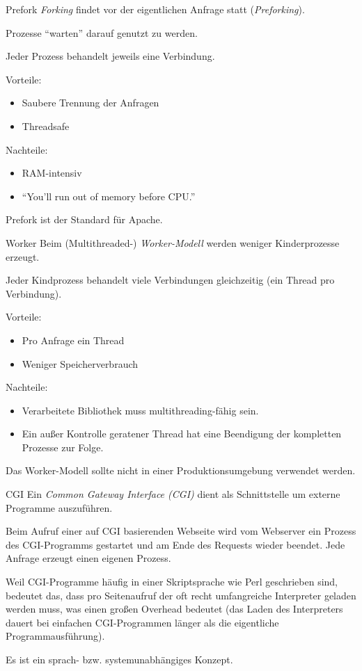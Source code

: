 \begin{defi}{Prefork}
    \emph{Forking} findet vor der eigentlichen Anfrage statt (\emph{Preforking}).

    Prozesse \enquote{warten} darauf genutzt zu werden.

    Jeder Prozess behandelt jeweils eine Verbindung.

    Vorteile:
    \begin{itemize}
        \item Saubere Trennung der Anfragen
        \item Threadsafe
    \end{itemize}

    Nachteile:
    \begin{itemize}
        \item RAM-intensiv
        \item \enquote{You'll run out of memory before CPU.}
    \end{itemize}

    Prefork ist der Standard für Apache.
\end{defi}

\begin{defi}{Worker}
    Beim (Multithreaded-) \emph{Worker-Modell} werden weniger Kinderprozesse erzeugt.

    Jeder Kindprozess behandelt viele Verbindungen gleichzeitig (ein Thread pro Verbindung).

    Vorteile:
    \begin{itemize}
        \item Pro Anfrage ein Thread
        \item Weniger Speicherverbrauch
    \end{itemize}

    Nachteile:
    \begin{itemize}
        \item Verarbeitete Bibliothek muss multithreading-fähig sein.
        \item Ein außer Kontrolle geratener Thread hat eine Beendigung der kompletten Prozesse zur Folge.
    \end{itemize}

    Das Worker-Modell sollte nicht in einer Produktionsumgebung verwendet werden.
\end{defi}

\begin{defi}{CGI}
    Ein \emph{Common Gateway Interface (CGI)} dient als Schnittstelle um externe Programme auszuführen.

    Beim Aufruf einer auf CGI basierenden Webseite wird vom Webserver ein Prozess des CGI-Programms gestartet und am Ende des Requests wieder beendet.
    Jede Anfrage erzeugt einen eigenen Prozess.

    Weil CGI-Programme häufig in einer Skriptsprache wie Perl geschrieben sind, bedeutet das, dass pro Seitenaufruf der oft recht umfangreiche Interpreter geladen werden muss, was einen großen Overhead bedeutet (das Laden des Interpreters dauert bei einfachen CGI-Programmen länger als die eigentliche Programmausführung).


    Es ist ein sprach- bzw. systemunabhängiges Konzept.
\end{defi}

